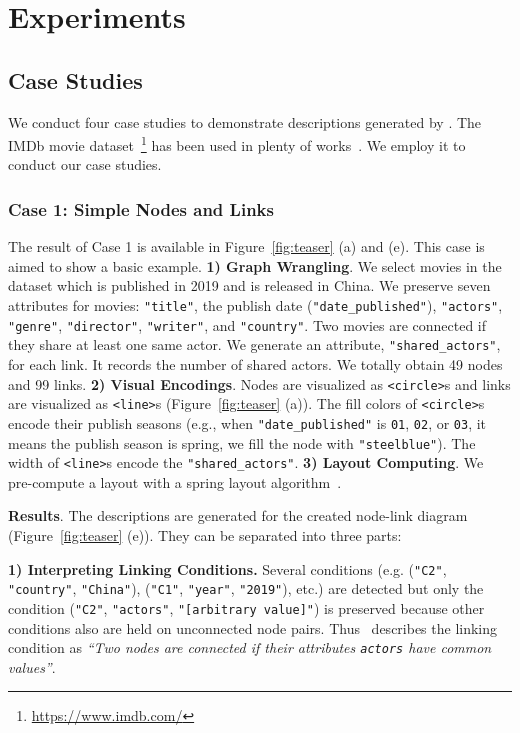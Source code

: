 \section{Experiments}
\subsection{Case Studies}
We conduct four case studies to demonstrate descriptions generated by \ApproachName.
The IMDb movie dataset~\footnote{\url{https://www.imdb.com/}} has been used in plenty of works~\cite{DBLP:journals/tvcg/SrinivasanPEB18, DBLP:journals/pvldb/KrishnanWWFG16, DBLP:conf/ieeevast/BigelowNML19}.
We employ it to conduct our case studies.


\subsubsection{Case 1: Simple Nodes and Links}\label{sec:imdb_movies}
The result of Case 1 is available in Figure~\ref{fig:teaser} (a) and (e).
This case is aimed to show a basic example.
\textbf{1) Graph Wrangling}. We select movies in the dataset which is published in 2019 and is released in China.
We preserve seven attributes for movies: \texttt{"title"}, the publish date (\texttt{"date\_published"}), \texttt{"actors"}, \texttt{"genre"}, \texttt{"director"}, \texttt{"writer"}, and \texttt{"country"}.
Two movies are connected if they share at least one same actor.
We generate an attribute, \texttt{"shared\_actors"}, for each link. 
It records the number of shared actors.
We totally obtain 49 nodes and 99 links.
\textbf{2) Visual Encodings}. 
Nodes are visualized as \texttt{<circle>}s and links are visualized as \texttt{<line>}s (Figure~\ref{fig:teaser} (a)).
The fill colors of \texttt{<circle>}s encode their publish seasons (e.g., when \texttt{"date\_published"} is \texttt{01}, \texttt{02}, or \texttt{03}, it means the publish season is spring, we fill the node with \texttt{"steelblue"}).
The width of \texttt{<line>}s encode the \texttt{"shared\_actors"}.
\textbf{3) Layout Computing}. 
We pre-compute a layout with a spring layout algorithm~\cite{DBLP:journals/spe/FruchtermanR91}.

\textbf{Results}.
The descriptions are generated for the created node-link diagram (Figure~\ref{fig:teaser} (e)).
They can be separated into three parts:

\textbf{1) Interpreting Linking Conditions.} Several conditions (e.g. (\texttt{"C2"}, \texttt{"country"}, \texttt{"China"}), (\texttt{"C1"}, \texttt{"year"}, \texttt{"2019"}), etc.) are detected but only the condition (\texttt{"C2"}, \texttt{"actors"}, \texttt{"[arbitrary value]"}) is preserved because other conditions also are held on unconnected node pairs.
Thus \ApproachName~describes the linking condition as \textit{``Two nodes are connected if their attributes {\texttt{actors}} have common values''}.

